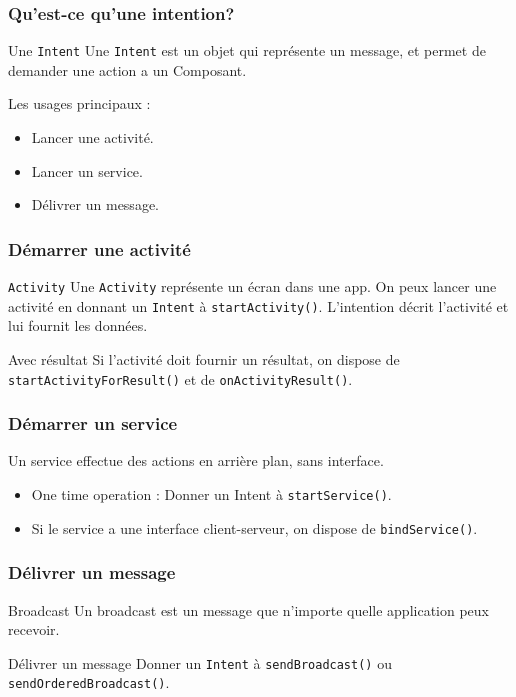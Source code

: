 \documentclass{beamer}
\begin{document}
\begin{frame}
\frametitle{Qu'est-ce qu'une intention?}

\begin{block}{Une \verb!Intent!}
Une \verb!Intent! est un objet qui représente un message, et permet de demander une action a un Composant.
\end{block}

\begin{block}{Les usages principaux :}
	\begin{itemize}
		\item Lancer une activité.
		\item Lancer un service.
		\item Délivrer un message.
	\end{itemize}
\end{block}
\end{frame}


\begin{frame}
\frametitle{Démarrer une activité}

\begin{block}{\verb!Activity!}
Une \verb!Activity! représente un écran dans une app. On peux lancer une activité en donnant un \verb!Intent! à \verb!startActivity()!. L'intention décrit l'activité et lui fournit les données.
\end{block}

\begin{block}{Avec résultat}
Si l'activité doit fournir un résultat, on dispose de \verb!startActivityForResult()! et de \verb!onActivityResult()!.
\end{block}
\end{frame}

\begin{frame}
\frametitle{Démarrer un service}

\begin{block}{Un service effectue des actions en arrière plan, sans interface.}

\begin{itemize}
\item One time operation : Donner un Intent à \verb!startService()!.
\item Si le service a une interface client-serveur, on dispose de \verb!bindService()!.
\end{itemize}
\end{block}
\end{frame}

\begin{frame}
\frametitle{Délivrer un message}

\begin{block}{Broadcast}
Un broadcast est un message que n'importe quelle application peux recevoir.
\end{block}

\begin{block}{Délivrer un message}
Donner un \verb!Intent! à \verb!sendBroadcast()! ou \verb!sendOrderedBroadcast()!.
\end{block}
\end{frame}
\end{document}
